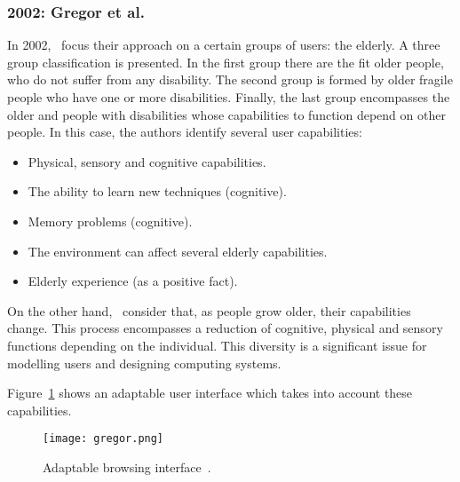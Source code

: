 \subsubsection{2002: Gregor et al.}
\label{sec:gregor}

In 2002,~\citet{gregor_designing_2002} focus their approach on a certain groups 
of users: the elderly. A three group classification is presented. In the first 
group there are the fit older people, who do not suffer from any disability. The 
second group is formed by older fragile people who have one or more 
disabilities. Finally, the last group encompasses the older and people with 
disabilities whose capabilities to function depend on other people. In this 
case, the authors identify several user capabilities:

\begin{itemize}
 \item Physical, sensory and cognitive capabilities.
 \item The ability to learn new techniques (cognitive).
 \item Memory problems (cognitive).
 \item The environment can affect several elderly capabilities.
 \item Elderly experience (as a positive fact).
\end{itemize}

On the other hand,~\citet{gregor_designing_2002} consider that, as people grow 
older, their capabilities change. This process encompasses a reduction of 
cognitive, physical and sensory functions depending on the individual. This 
diversity is a significant issue for modelling users and designing computing 
systems.

Figure~\ref{fig:gregor} shows an adaptable user interface which takes into 
account these capabilities. 


\begin{figure}
\centering
\texttt{[image: gregor.png]}
\caption{Adaptable browsing 
interface~\citep{gregor_designing_2002}.}
\label{fig:gregor}
\end{figure}